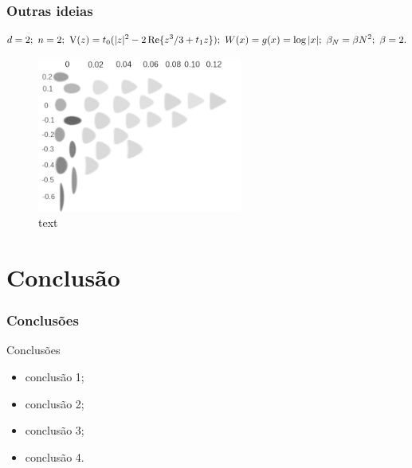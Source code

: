 \begin{frame}
	\frametitle{Outras ideias}
	\begin{equation}
		d = 2; \  n = 2; \  \operatorname{V}(z)= t_0(|z|^{2} - 2\Re\{z^3/3 + t_1 z\});  \ W(x) = g(x) = \log{|x|};  \ \beta_N = \beta N^2;  \ \beta = 2.
		\label{Equation: Complex Shapes}
	\end{equation}
	\begin{figure}
		\centering
		\includegraphics[width=0.6\textwidth]{./media/Results/allshapes}	
		\caption{text}
	\end{figure}
\end{frame}


\section{Conclusão}

\begin{frame}
	\frametitle{Conclusões}
	Conclusões
	
	\begin{itemize}
		\item<1> conclusão 1;
		\item<2> conclusão 2;
		\item<3> conclusão 3;
		\item<4> conclusão 4.
	\end{itemize}
\end{frame}


